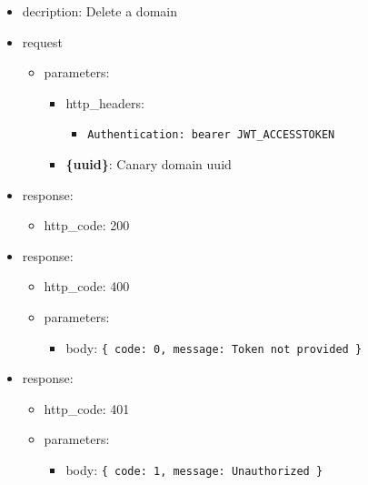 \documentclass[
]{article}
\begin{document}
\begin{itemize}
\item
  decription: Delete a domain
\item
  request

  \begin{itemize}
  \item
    parameters:

    \begin{itemize}
    \item
      http\_headers:

      \begin{itemize}
      \item
        \texttt{Authentication:\ \textquotesingle{}bearer\ JWT\_ACCESSTOKEN\textquotesingle{}}
      \end{itemize}
    \item
      \textbf{\{uuid\}}: Canary domain uuid
    \end{itemize}
  \end{itemize}
\item
  response:

  \begin{itemize}
  \item
    http\_code: 200
  \end{itemize}
\item
  response:

  \begin{itemize}
  \item
    http\_code: 400
  \item
    parameters:

    \begin{itemize}
    \item
      body: \texttt{\{
      \textquotesingle{}code\textquotesingle{}:\ 0,\ 
      \textquotesingle{}message\textquotesingle{}:\ \textquotesingle{}Token\ not\ provided\textquotesingle{}
      \}}
    \end{itemize}
  \end{itemize}
\item
  response:

  \begin{itemize}
  \item
    http\_code: 401
  \item
    parameters:

    \begin{itemize}
    \item
      body: \texttt{\{
      \textquotesingle{}code\textquotesingle{}:\ 1,\ 
      \textquotesingle{}message\textquotesingle{}:\ \textquotesingle{}Unauthorized\textquotesingle{}
      \}}
    \end{itemize}
  \end{itemize}
\end{itemize}
\end{document}
